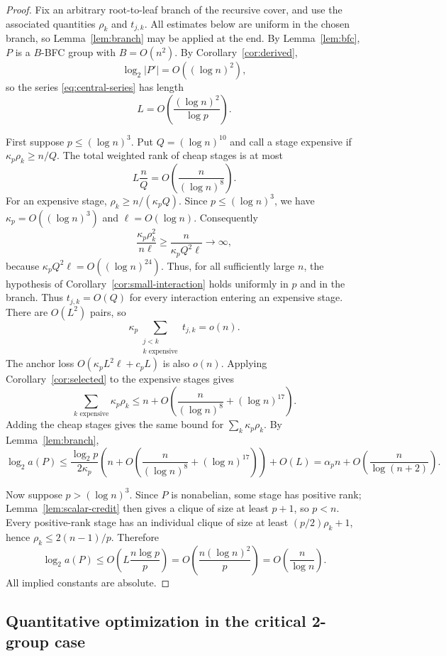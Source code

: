 \documentclass[11pt]{article}
\theoremstyle{definition}
\theoremstyle{remark}
\begin{document}
\begin{proof}
Fix an arbitrary root-to-leaf branch of the recursive cover, and use the associated quantities $\rho_k$ and $t_{j,k}$. All estimates below are uniform in the chosen branch, so Lemma~\ref{lem:branch} may be applied at the end. By Lemma~\ref{lem:bfc}, $P$ is a $B$-BFC group with $B=O(n^2)$. By Corollary~\ref{cor:derived},
\[
\log_2|P'|=O((\log n)^2),
\]
so the series \eqref{eq:central-series} has length
\[
L=O\!\left(\frac{(\log n)^2}{\log p}\right).
\]

First suppose $p\le(\log n)^3$. Put $Q=(\log n)^{10}$ and call a stage expensive if $\kappa_p\rho_k\ge n/Q$. The total weighted rank of cheap stages is at most
\[
L\frac nQ=O\!\left(\frac{n}{(\log n)^8}\right).
\]
For an expensive stage, $\rho_k\ge n/(\kappa_pQ)$. Since $p\le(\log n)^3$, we have $\kappa_p=O((\log n)^3)$ and $\ell=O(\log n)$. Consequently
\[
\frac{\kappa_p\rho_k^2}{n\ell}\ge\frac{n}{\kappa_pQ^2\ell}\longrightarrow\infty,
\]
because $\kappa_pQ^2\ell=O((\log n)^{24})$. Thus, for all sufficiently large $n$, the hypothesis of Corollary~\ref{cor:small-interaction} holds uniformly in $p$ and in the branch. Thus $t_{j,k}=O(Q)$ for every interaction entering an expensive stage. There are $O(L^2)$ pairs, so
\[
\kappa_p\sum_{\substack{j<k\\ k\text{ expensive}}}t_{j,k}=o(n).
\]
The anchor loss $O(\kappa_pL^2\ell+c_pL)$ is also $o(n)$. Applying Corollary~\ref{cor:selected} to the expensive stages gives
\[
\sum_{k\text{ expensive}}\kappa_p\rho_k
\le n+O\!\left(\frac{n}{(\log n)^8}+(\log n)^{17}\right).
\]
Adding the cheap stages gives the same bound for $\sum_k\kappa_p\rho_k$. By Lemma~\ref{lem:branch},
\[
\log_2a(P)\le\frac{\log_2p}{2\kappa_p}
\left(n+O\!\left(\frac{n}{(\log n)^8}+(\log n)^{17}\right)\right)+O(L)
=\alpha_p n+O\!\left(\frac{n}{\log(n+2)}\right).
\]

Now suppose $p>(\log n)^3$. Since $P$ is nonabelian, some stage has positive rank; Lemma~\ref{lem:scalar-credit} then gives a clique of size at least $p+1$, so $p<n$. Every positive-rank stage has an individual clique of size at least $(p/2)\rho_k+1$, hence $\rho_k\le2(n-1)/p$. Therefore
\[
\log_2a(P)\le O\!\left(L\frac{n\log p}{p}\right)
=O\!\left(\frac{n(\log n)^2}{p}\right)
=O\!\left(\frac{n}{\log n}\right).
\]
All implied constants are absolute.
\end{proof}

\subsection{Quantitative optimization in the critical 2-group case}
\end{document}
